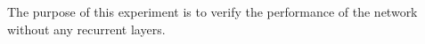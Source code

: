 
The purpose of this experiment is to verify the performance
of the network without any recurrent layers.
